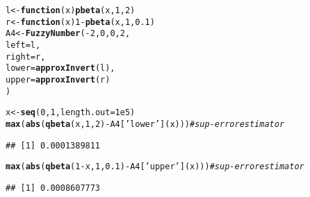 \documentclass[11pt]{article}\usepackage[]{graphicx}\usepackage[]{color}
\makeatletter
\newcommand{\hlnum}[1]{\textcolor[rgb]{0.686,0.059,0.569}{#1}}%
\newcommand{\hlstr}[1]{\textcolor[rgb]{0.192,0.494,0.8}{#1}}%
\newcommand{\hlcom}[1]{\textcolor[rgb]{0.678,0.584,0.686}{\textit{#1}}}%
\newcommand{\hlopt}[1]{\textcolor[rgb]{0,0,0}{#1}}%
\newcommand{\hlstd}[1]{\textcolor[rgb]{0.345,0.345,0.345}{#1}}%
\newcommand{\hlkwa}[1]{\textcolor[rgb]{0.161,0.373,0.58}{\textbf{#1}}}%
\newcommand{\hlkwb}[1]{\textcolor[rgb]{0.69,0.353,0.396}{#1}}%
\newcommand{\hlkwc}[1]{\textcolor[rgb]{0.333,0.667,0.333}{#1}}%
\newcommand{\hlkwd}[1]{\textcolor[rgb]{0.737,0.353,0.396}{\textbf{#1}}}%
\newenvironment{kframe}{%
 \def\at@end@of@kframe{}%
 \ifinner\ifhmode%
  \def\at@end@of@kframe{\end{minipage}}%
  \begin{minipage}{\columnwidth}%
 \fi\fi%
 \def\FrameCommand##1{\hskip\@totalleftmargin \hskip-\fboxsep
 \colorbox{shadecolor}{##1}\hskip-\fboxsep
     \hskip-\linewidth \hskip-\@totalleftmargin \hskip\columnwidth}%
 \MakeFramed {\advance\hsize-\width
   \@totalleftmargin\z@ \linewidth\hsize
   \@setminipage}}%
 {\par\unskip\endMakeFramed%
 \at@end@of@kframe}
\newenvironment{knitrout}{}{} %
\makeatother
\begin{document}
\begin{knitrout}\small
{}\color{fgcolor}\begin{kframe}
\begin{alltt}
\hlstd{l} \hlkwb{<-} \hlkwa{function}\hlstd{(}\hlkwc{x}\hlstd{)} \hlkwd{pbeta}\hlstd{(x,} \hlnum{1}\hlstd{,} \hlnum{2}\hlstd{)}
\hlstd{r} \hlkwb{<-} \hlkwa{function}\hlstd{(}\hlkwc{x}\hlstd{)} \hlnum{1}\hlopt{-}\hlkwd{pbeta}\hlstd{(x,} \hlnum{1}\hlstd{,} \hlnum{0.1}\hlstd{)}
\hlstd{A4} \hlkwb{<-} \hlkwd{FuzzyNumber}\hlstd{(}\hlopt{-}\hlnum{2}\hlstd{,} \hlnum{0}\hlstd{,} \hlnum{0}\hlstd{,} \hlnum{2}\hlstd{,}
   \hlkwc{left}  \hlstd{= l,}
   \hlkwc{right} \hlstd{= r,}
   \hlkwc{lower} \hlstd{=} \hlkwd{approxInvert}\hlstd{(l),}
   \hlkwc{upper} \hlstd{=} \hlkwd{approxInvert}\hlstd{(r)}
\hlstd{)}

\hlstd{x} \hlkwb{<-} \hlkwd{seq}\hlstd{(}\hlnum{0}\hlstd{,}\hlnum{1}\hlstd{,}\hlkwc{length.out}\hlstd{=}\hlnum{1e5}\hlstd{)}
\hlkwd{max}\hlstd{(}\hlkwd{abs}\hlstd{(}\hlkwd{qbeta}\hlstd{(x,} \hlnum{1}\hlstd{,} \hlnum{2}\hlstd{)} \hlopt{-} \hlstd{A4[}\hlstr{'lower'}\hlstd{](x)))}     \hlcom{# sup-error estimator}
\end{alltt}
\begin{verbatim}
## [1] 0.0001389811
\end{verbatim}
\begin{alltt}
\hlkwd{max}\hlstd{(}\hlkwd{abs}\hlstd{(}\hlkwd{qbeta}\hlstd{(}\hlnum{1}\hlopt{-}\hlstd{x,} \hlnum{1}\hlstd{,} \hlnum{0.1}\hlstd{)} \hlopt{-} \hlstd{A4[}\hlstr{'upper'}\hlstd{](x)))} \hlcom{# sup-error estimator}
\end{alltt}
\begin{verbatim}
## [1] 0.0008607773
\end{verbatim}
\end{kframe}
\end{knitrout}



%
\end{document}
